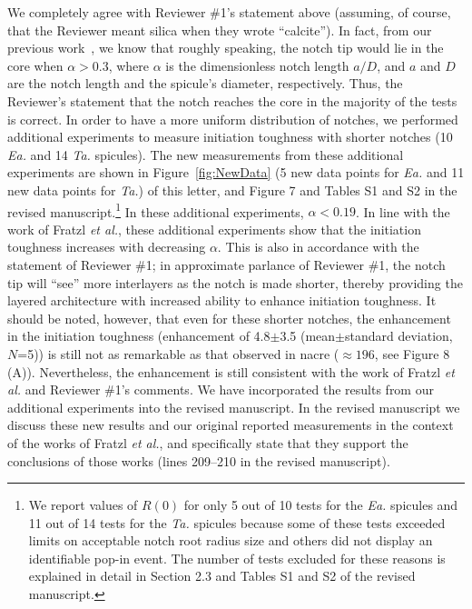 \documentclass[11pt,letterpaper]{report}
\makeatletter
\newcommand{\TA}{\textit{Ta.\@}\xspace}
\newcommand{\EA}{\textit{Ea.\@}\xspace}
\makeatother
\begin{document}
We completely agree with Reviewer \#1's statement above (assuming, of course, that the Reviewer meant silica when they wrote ``calcite''). In fact, from our previous work~\cite{monn2015new}, we know that roughly speaking, the notch tip would lie in the core when $\alpha>0.3$, where $\alpha$ is the dimensionless notch length $a/D$, and $a$ and $D$ are the notch length and the spicule's diameter, respectively. Thus, the Reviewer's statement that the notch reaches the core in the majority of the tests is correct. In order to have a more uniform distribution of notches, we performed additional experiments to measure initiation toughness with shorter notches (10 \EA and 14 \TA spicules).
The new measurements from these additional experiments are shown in Figure~\ref{fig:NewData} (5 new data points for \textit{Ea.} and 11 new data points for \textit{Ta.}) of this letter, and Figure 7 and Tables S1 and S2 in the revised manuscript.\footnote{We report values of $R(0)$ for only 5 out of 10 tests for the \EA spicules and 11 out of 14 tests for the \TA spicules because some of these tests exceeded limits on acceptable notch root radius size and others did not display an identifiable pop-in event. The number of tests excluded for these reasons is explained in detail in Section 2.3 and Tables S1 and S2 of the revised manuscript.}
In these additional experiments,  $\alpha<0.19$. In line with the work of Fratzl \textit{et al.}, these additional experiments show that the initiation toughness increases with decreasing $\alpha$. This is also in accordance with the statement of Reviewer \#1; in approximate parlance of Reviewer \#1, the notch tip will ``see'' more interlayers as the notch is made shorter, thereby providing the layered architecture with increased ability to enhance initiation toughness. It should be noted, however, that even for these shorter notches, the enhancement in the initiation toughness (enhancement of 4.8$\pm$3.5 (mean$\pm$standard deviation, $N$=5)) is still not as remarkable as that observed in nacre ($\approx 196$, see Figure 8 (A)). Nevertheless, the enhancement is still consistent with the work of Fratzl \textit{et al.} and Reviewer \#1's comments. We have incorporated the results from our additional experiments into the revised manuscript. In the revised manuscript we discuss these new results and our original reported measurements in the context of the works of Fratzl \textit{et al.}, and specifically state that they support the conclusions of those works (lines 209--210 in the revised manuscript).
\end{document}
